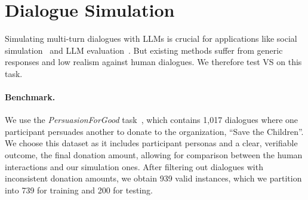 \section{Dialogue Simulation} \label{sec:dialogue_simulation_task}
\vspace{-0.5em}


Simulating multi-turn dialogues with LLMs is crucial for applications like social simulation~\citep{lin2025usersimulators, anthisposition} and LLM evaluation~\citep{zhou2024sotopiainteractiveevaluationsocial}. But existing methods suffer from generic responses and low realism against human dialogues. We therefore test VS on this task.

\paragraph{Benchmark.}
We use the \textit{PersuasionForGood} task~\citep{wang-etal-2019-persuasion}, which contains 1,017 dialogues where one participant persuades another to donate to the organization, ``Save the Children''. We choose this dataset as it includes participant personas and a clear, verifiable outcome, the final donation amount, allowing for comparison between the human interactions and our simulation ones. After filtering out dialogues with inconsistent donation amounts, we obtain 939 valid instances, which we partition into 739 for training and 200 for testing.




